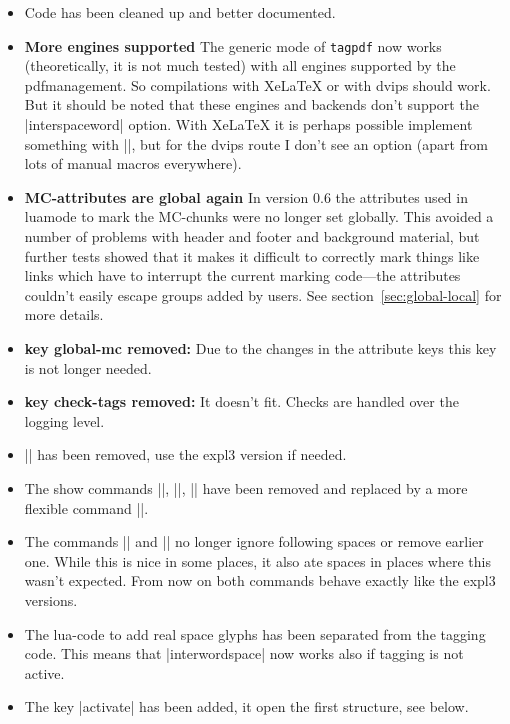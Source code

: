 \documentclass[DIV=12,parskip=half-,bibliography=totoc]{scrartcl}
\newcommand\pkg[1]{\texttt{#1}}
\begin{document}
\begin{itemize}
\item Code has been cleaned up and better documented.

\item \textbf{More engines supported} The generic mode of \pkg{tagpdf} now works
(theoretically, it is not much tested) with all engines supported
by the pdfmanagement. So compilations with Xe\LaTeX{} or with dvips should work. But it should be noted that
these engines and backends don't support the |interspaceword| option. With Xe\LaTeX{} it is perhaps possible
implement something with |\XeTeXinterchartoks|, but for the dvips route I don't see an option (apart from lots
of manual macros everywhere).
\item \textbf{MC-attributes are global again} In version 0.6 the attributes used in
luamode to mark the MC-chunks were no longer set globally. This avoided a number of problems with header and footer
and background material, but further tests showed that it makes it difficult to correctly mark things like
links which have to interrupt the current marking code---the attributes couldn't easily escape groups added by
users. See section~\ref{sec:global-local} for more details.
\item \textbf{key global-mc removed:} Due to the changes in the attribute keys this key is not longer needed.
\item \textbf{key check-tags removed:} It doesn't fit. Checks are handled over the logging level.
\item |\tagpdfget| has been removed, use the expl3 version if needed.
\item The show commands |\showtagpdfmcdata|, |\showtagpdfattributes|, |\showtagstack| have been removed and replaced
by a more flexible command |\ShowTagging|.
\item The commands |\tagmcbegin| and |\tagmcend| no longer ignore following spaces or remove earlier one. While this
is nice in some places, it also ate spaces in places where this wasn't expected. From now on both commands behave exactly
like the expl3 versions.
\item The lua-code to add real space glyphs has been separated from the tagging code. This means that |interwordspace| now
works also if tagging is not active.
\item The key |activate| has been added, it open the first structure, see below.
\end{itemize}
\end{document}
